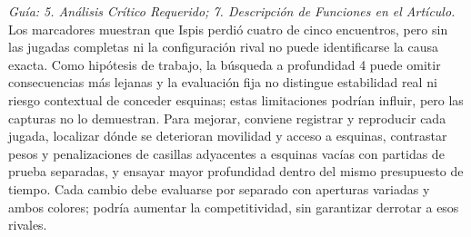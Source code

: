 \textit{Guía: 5. Análisis Crítico Requerido; 7. Descripción de Funciones en el Artículo.}
Los marcadores muestran que Ispis perdió cuatro de cinco encuentros, pero sin las jugadas completas ni la configuración rival no puede identificarse la causa exacta. Como hipótesis de trabajo, la búsqueda a profundidad 4 puede omitir consecuencias más lejanas y la evaluación fija no distingue estabilidad real ni riesgo contextual de conceder esquinas; estas limitaciones podrían influir, pero las capturas no lo demuestran. Para mejorar, conviene registrar y reproducir cada jugada, localizar dónde se deterioran movilidad y acceso a esquinas, contrastar pesos y penalizaciones de casillas adyacentes a esquinas vacías con partidas de prueba separadas, y ensayar mayor profundidad dentro del mismo presupuesto de tiempo. Cada cambio debe evaluarse por separado con aperturas variadas y ambos colores; podría aumentar la competitividad, sin garantizar derrotar a esos rivales.
